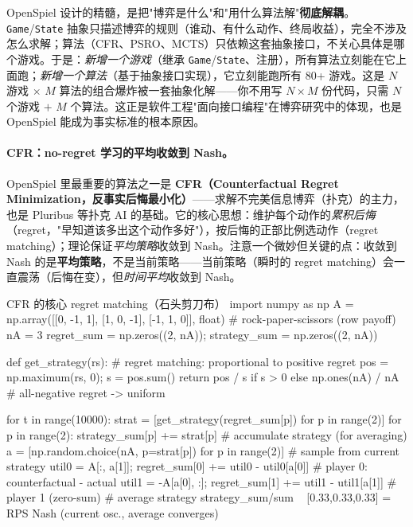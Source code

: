 \begin{insight}[统一抽象 $=$ "博弈"与"算法"解耦]
OpenSpiel 设计的精髓，是把"博弈是什么"和"用什么算法解"\textbf{彻底解耦}。\texttt{Game}/\allowbreak\texttt{State} 抽象只描述博弈的规则（谁动、有什么动作、终局收益），完全不涉及怎么求解；算法（CFR、PSRO、MCTS）只依赖这套抽象接口，不关心具体是哪个游戏。于是：\emph{新增一个游戏}（继承 \texttt{Game}/\allowbreak\texttt{State}、注册），所有算法立刻能在它上面跑；\emph{新增一个算法}（基于抽象接口实现），它立刻能跑所有 80+ 游戏。这是 $N$ 游戏 $\times$ $M$ 算法的组合爆炸被一套抽象化解——你不用写 $N\times M$ 份代码，只需 $N$ 个游戏 $+$ $M$ 个算法。这正是软件工程"面向接口编程"在博弈研究中的体现，也是 OpenSpiel 能成为事实标准的根本原因。
\end{insight}

\paragraph{CFR：no-regret 学习的平均收敛到 Nash。}
OpenSpiel 里最重要的算法之一是 \textbf{CFR（Counterfactual Regret Minimization，反事实后悔最小化）}\cite{zinkevich2008cfr}——求解不完美信息博弈（扑克）的主力，也是 Pluribus 等扑克 AI 的基础。它的核心思想：维护每个动作的\emph{累积后悔}（regret，"早知道该多出这个动作多好"），按后悔的正部比例选动作（regret matching）；理论保证\emph{平均策略}收敛到 Nash。注意一个微妙但关键的点：收敛到 Nash 的是\textbf{平均策略}，不是当前策略——当前策略（瞬时的 regret matching）会一直震荡（后悔在变），但\emph{时间平均}收敛到 Nash。

\begin{codebox}[Python]{CFR 的核心 regret matching（石头剪刀布）}
import numpy as np
A = np.array([[0, -1, 1], [1, 0, -1], [-1, 1, 0]], float)   # rock-paper-scissors (row payoff)
nA = 3
regret_sum = np.zeros((2, nA)); strategy_sum = np.zeros((2, nA))

def get_strategy(rs):                                # regret matching: proportional to positive regret
    pos = np.maximum(rs, 0); s = pos.sum()
    return pos / s if s > 0 else np.ones(nA) / nA    # all-negative regret -> uniform

for t in range(10000):
    strat = [get_strategy(regret_sum[p]) for p in range(2)]
    for p in range(2):
        strategy_sum[p] += strat[p]                  # accumulate strategy (for averaging)
    a = [np.random.choice(nA, p=strat[p]) for p in range(2)]   # sample from current strategy
    util0 = A[:, a[1]]; regret_sum[0] += util0 - util0[a[0]]   # player 0: counterfactual - actual
    util1 = -A[a[0], :]; regret_sum[1] += util1 - util1[a[1]]  # player 1 (zero-sum)
# average strategy strategy_sum/sum ~ [0.33,0.33,0.33] = RPS Nash (current osc., average converges)
\end{codebox}

